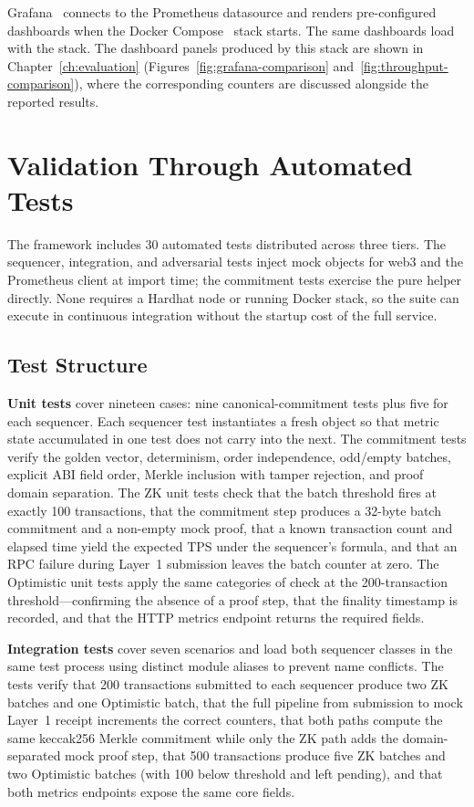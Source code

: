 Grafana~\cite{grafana2024} connects to the Prometheus datasource and renders pre-configured dashboards when the Docker Compose~\cite{compose2024} stack starts. The same dashboards load with the stack. The dashboard panels produced by this stack are shown in Chapter~\ref{ch:evaluation} (Figures~\ref{fig:grafana-comparison} and~\ref{fig:throughput-comparison}), where the corresponding counters are discussed alongside the reported results.

\section{Validation Through Automated Tests}
\label{sec:tests}

The framework includes 30 automated tests distributed across three tiers. The sequencer, integration, and adversarial tests inject mock objects for web3 and the Prometheus client at import time; the commitment tests exercise the pure helper directly. None requires a Hardhat node or running Docker stack, so the suite can execute in continuous integration without the startup cost of the full service.

\subsection{Test Structure}

\textbf{Unit tests} cover nineteen cases: nine canonical-commitment tests plus five for each sequencer. Each sequencer test instantiates a fresh object so that metric state accumulated in one test does not carry into the next. The commitment tests verify the golden vector, determinism, order independence, odd/empty batches, explicit ABI field order, Merkle inclusion with tamper rejection, and proof domain separation. The ZK unit tests check that the batch threshold fires at exactly 100 transactions, that the commitment step produces a 32-byte batch commitment and a non-empty mock proof, that a known transaction count and elapsed time yield the expected TPS under the sequencer's formula, and that an RPC failure during Layer~1 submission leaves the batch counter at zero. The Optimistic unit tests apply the same categories of check at the 200-transaction threshold—confirming the absence of a proof step, that the finality timestamp is recorded, and that the HTTP metrics endpoint returns the required fields.

\textbf{Integration tests} cover seven scenarios and load both sequencer classes in the same test process using distinct module aliases to prevent name conflicts. The tests verify that 200 transactions submitted to each sequencer produce two ZK batches and one Optimistic batch, that the full pipeline from submission to mock Layer~1 receipt increments the correct counters, that both paths compute the same keccak256 Merkle commitment while only the ZK path adds the domain-separated mock proof step, that 500 transactions produce five ZK batches and two Optimistic batches (with 100 below threshold and left pending), and that both metrics endpoints expose the same core fields.

